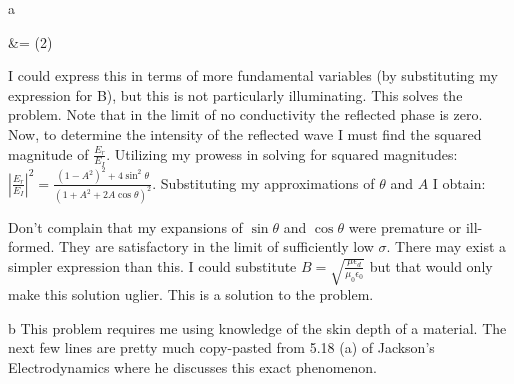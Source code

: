 \begin{homeworkProblem}
\begin{homeworkSection}{a}
\begin{problemAnswer}{\Phi &= \arctan(2)}\end{problemAnswer}

I could express this in terms of more fundamental variables (by substituting my expression for B), but this is not particularly illuminating. This solves the problem. Note that in the limit of no conductivity the reflected phase is zero.
\\

Now, to determine the intensity of the reflected wave I must find the squared magnitude of $\frac{E_r}{E_I}$. Utilizing my prowess in solving for squared magnitudes: $|\frac{E_r}{E_I}|^2 = \frac{(1-A^2)^2+4\sin^2\theta}{(1+A^2+2A\cos\theta)^2}$. Substituting my approximations of $\theta$ and $A$ I obtain: 
\\

\begin{problemAnswer}{ }\end{problemAnswer}

Don't complain that my expansions of $\sin\theta$ and $\cos\theta$ were premature or ill-formed. They are satisfactory in the limit of sufficiently low $\sigma$. There may exist a simpler expression than this. I could substitute $B = \sqrt{\frac{\mu\epsilon_d}{\mu_0 \epsilon_0}}$ but that would only make this solution uglier. This is a solution to the problem. 

\end{homeworkSection}

\begin{homeworkSection}{b}
This problem requires me using knowledge of the skin depth of a material. The next few lines are pretty much copy-pasted from 5.18 (a) of Jackson's Electrodynamics where he discusses this exact phenomenon.
\\


\end{homeworkSection}
\end{homeworkProblem}
